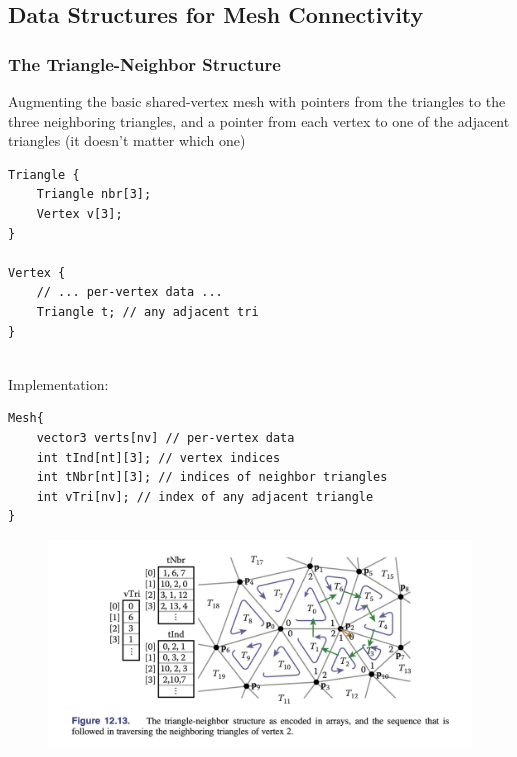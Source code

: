 \documentclass[11pt]{article}
\numberwithin{equation}{section}
\begin{document}
\noindent {}

\subsection{Data Structures for Mesh Connectivity}
\subsubsection{The Triangle-Neighbor Structure}
Augmenting the basic shared-vertex mesh with pointers from the triangles to the three neighboring triangles, and a pointer from each vertex to one of the adjacent triangles (it doesn't matter which one)
\begin{framed}
\begin{verbatim}
Triangle {
	Triangle nbr[3];
	Vertex v[3];
}

Vertex {
	// ... per-vertex data ...
	Triangle t; // any adjacent tri
}
\end{verbatim}
\end{framed}
\noindent {}\\
Implementation:
\begin{framed}
\begin{verbatim}
Mesh{
	vector3 verts[nv] // per-vertex data 
	int tInd[nt][3]; // vertex indices
	int tNbr[nt][3]; // indices of neighbor triangles
	int vTri[nv]; // index of any adjacent triangle
}
\end{verbatim}
\end{framed}

\begin{figure}[H]
	\centering
	\includegraphics[scale=0.4]{p21}
\end{figure}
\end{document}
